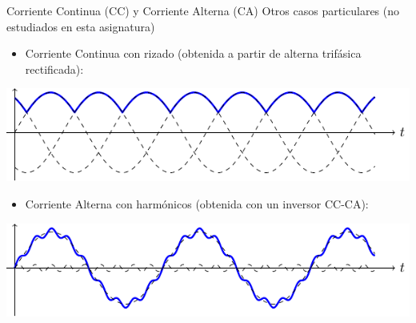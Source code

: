 \documentclass[aspectratio=169, xcolor={usenames,svgnames,dvipsnames}]{beamer}
\begin{document}
\begin{frame}{Corriente Continua (CC) y Corriente Alterna (CA)}
{Otros casos particulares (no estudiados en esta asignatura)}

    \vspace{1mm}
    \begin{itemize}
        \item Corriente \alert{Continua con rizado} (obtenida a partir de alterna trifásica rectificada):
    \end{itemize}
    \begin{center}
        \includegraphics[height=0.25\textheight]{../figs/CA_rectificada.pdf}
    \end{center}
    \vspace{-4mm}
    \begin{itemize}
        \item Corriente \alert{Alterna con harmónicos} (obtenida con un inversor CC-CA):
    \end{itemize}
    \begin{center}
        \includegraphics[height=0.25\textheight]{../figs/CA_armonicos.pdf}
    \end{center}
\end{frame}

\end{document}
